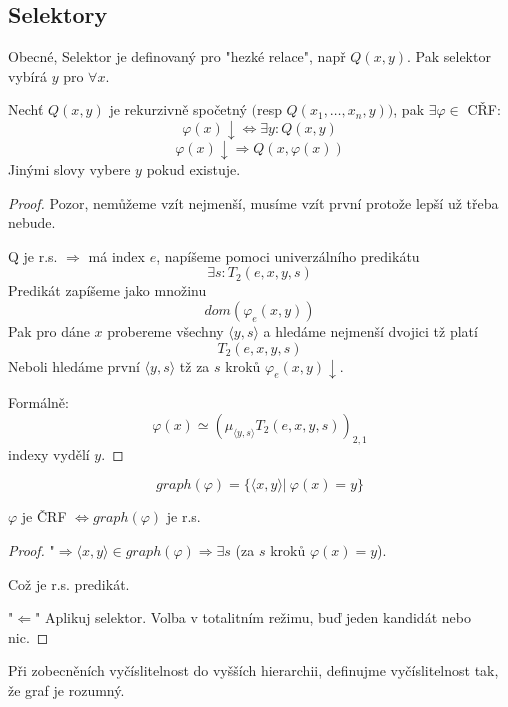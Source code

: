 \subsection{Selektory}

Obecné, Selektor je definovaný pro "hezké relace", např $Q(x, y)$.
Pak selektor vybírá $y$ pro $\forall x$.

\begin{theorem}[O selektoru]\label{selector}
	Nechť $Q(x, y)$ je rekurzivně spočetný $($resp $Q(x_1, \ldots, x_n, y))$, pak $\exists \varphi \in$ CŘF:
	\[ \varphi(x) \downarrow \iff \exists y: Q(x, y) \]
		\[ \varphi(x) \downarrow \Rightarrow Q(x, \varphi(x)) \]
	Jinými slovy vybere $y$ pokud existuje.
\end{theorem}
\begin{proof}
	Pozor, nemůžeme vzít nejmenší, musíme vzít první protože lepší už třeba nebude.

	Q je r.s. $\Rightarrow$ má index $e$, napíšeme pomoci univerzálního predikátu
	\[ \exists s: T_2(e, x, y, s) \]
	Predikát zapíšeme jako množinu
	\[ dom(\varphi_e(x, y)) \]
	Pak pro dáne $x$ probereme všechny $\langle y, s \rangle$ a hledáme nejmenší dvojici tž platí
	\[ T_2(e, x, y, s) \]
	Neboli hledáme první $\langle y, s \rangle$ tž za $s$ kroků $\varphi_e(x,y) \downarrow$.

	Formálně:
	\[ \varphi(x) \simeq (\mu_{\langle y, s \rangle} T_2(e, x, y, s))_{2,1} \]
	indexy vydělí $y$.
\end{proof}

\begin{definition}
	\[ graph(\varphi) = \{ \langle x, y \rangle |\ \varphi(x) = y \} \]
\end{definition}
\begin{consequence}
	$\varphi$ je ČRF $\iff graph(\varphi)$ je r.s.
\end{consequence}
\begin{proof}
	"$\Rightarrow \langle x, y \rangle \in graph(\varphi) \Rightarrow \exists s$ (za $s$ kroků $\varphi(x) = y$).

	Což je r.s. predikát.

	"$\Leftarrow$" Aplikuj selektor. Volba v totalitním režimu, buď jeden kandidát nebo nic.
\end{proof}

\begin{note}
	Při zobecněních vyčíslitelnost do vyšších hierarchii, definujme vyčíslitelnost tak, že graf je rozumný.
\end{note}

